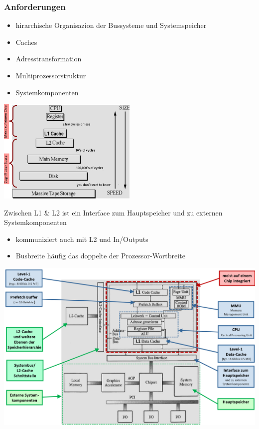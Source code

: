 \subsubsection{Anforderungen}
\begin{itemize}
    \item hirarchische Organisazion der Bussysteme und Systemspeicher
    \item Caches
    \item Adresstransformation
    \item Multiprozessorstruktur
    \item Systemkomponenten 
\end{itemize}
\begin{minipage}{0.5\linewidth}
    \includegraphics[width=0.5\textwidth]{images/SystembusSpeicherSpeichersystem/SpeicherSysHierarchie}
\end{minipage}\newline
Zwischen L1 \& L2 ist ein Interface zum Hauptspeicher und zu externen Systemkomponenten
\begin{itemize}
    \item kommuniziert auch mit L2 und In/Outputs
    \item Busbreite häufig das doppelte der Prozessor-Wortbreite
\end{itemize}
\begin{minipage}{0.5\linewidth}
    \includegraphics[width=\textwidth]{images/SystembusSpeicherSpeichersystem/SpeicherSysStrukt}
\end{minipage}\newline

